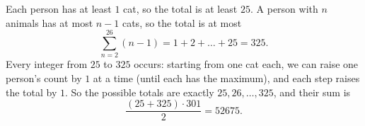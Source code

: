 Each person has at least $1$ cat, so the total is at least $25$. A person with $n$ animals has at most $n-1$ cats, so the total is at most
\[
\sum_{n=2}^{26}(n-1)=1+2+\dots+25=325 .
\]
Every integer from $25$ to $325$ occurs: starting from one cat each, we can raise one person's count by $1$ at a time (until each has the maximum), and each step raises the total by $1$. So the possible totals are exactly $25,26,\dots,325$, and their sum is
\[
\dfrac{(25+325)\cdot301}{2}=\boxed{52675}.
\]
